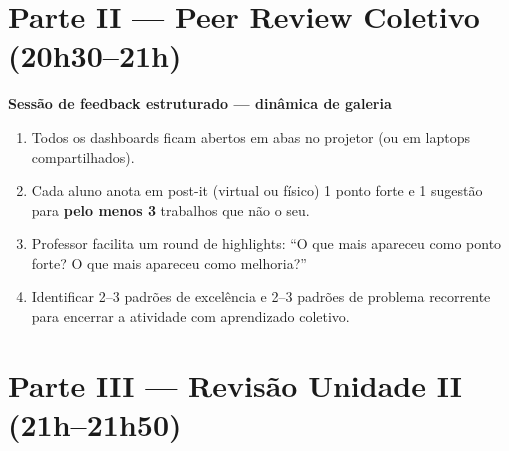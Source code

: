 \section{Parte II — Peer Review Coletivo (20h30–21h)}

\begin{BoardBox}
\textbf{Sessão de feedback estruturado — dinâmica de galeria}

\begin{enumerate}
  \item Todos os dashboards ficam abertos em abas no projetor (ou em laptops compartilhados).
  \item Cada aluno anota em post-it (virtual ou físico) 1 ponto forte e 1 sugestão
  para \textbf{pelo menos 3} trabalhos que não o seu.
  \item Professor facilita um round de highlights: ``O que mais apareceu como ponto forte?
  O que mais apareceu como melhoria?''
  \item Identificar 2–3 padrões de excelência e 2–3 padrões de problema recorrente
  para encerrar a atividade com aprendizado coletivo.
\end{enumerate}
\end{BoardBox}

\section{Parte III — Revisão Unidade II (21h–21h50)}

